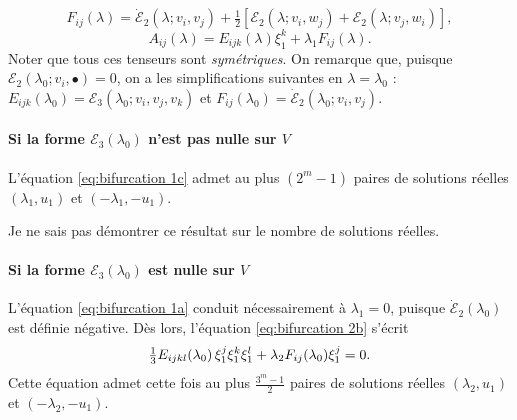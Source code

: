 \documentclass{article}
\newcommand{\nocomma}{}
\newcommand{\tmem}[1]{{\em #1\/}}
\begin{document}
\begin{equation}
  \label{eq:def Fij} F_{i \nocomma j} (\lambda) = \dot{\mathcal{E}}_2 (\lambda
  ; v_i, v_j) + \tfrac{1}{2}  [\mathcal{E}_2 (\lambda  ; v_i, w_j)
  +\mathcal{E}_2 (\lambda  ; v_j, w_i)],
\end{equation}
\begin{equation}
  \label{eq:def Aij} A_{i \nocomma j} (\lambda) = E_{i \nocomma j \nocomma k}
  (\lambda) \xi_1^k + \lambda_1 F_{i \nocomma j} (\lambda) .
\end{equation}
Noter que tous ces tenseurs sont {\tmem{symétriques}}. On remarque que,
puisque $\mathcal{E}_2 (\lambda_0 ; v_i, \bullet) = 0$, on a les
simplifications suivantes en $\lambda = \lambda_0$ : $E_{i \nocomma j \nocomma
k} (\lambda_0) =\mathcal{E}_3 (\lambda_0 ; v_i, v_j, v_k)$ et $F_{i \nocomma
j} (\lambda_0) = \dot{\mathcal{E}}_2 (\lambda_0 ; v_i, v_j)$.

\paragraph{Si la forme $\mathcal{E}_3 (\lambda_0)$ n'est pas nulle sur
$V$}L'équation \eqref{eq:bifurcation 1c} admet au plus $(2^m - 1)$ paires
de solutions réelles $(\lambda_1, u_1)$ et $(- \lambda_1, - u_1)$.

\begin{remark}
  Je ne sais pas démontrer ce résultat sur le nombre de solutions
  réelles.
\end{remark}

\paragraph{Si la forme $\mathcal{E}_3 (\lambda_0)$ est nulle sur
$V$}L'équation \eqref{eq:bifurcation 1a} conduit nécessairement à
$\lambda_1 = 0$, puisque $\dot{\mathcal{E}}_2 (\lambda_0)$ est définie
négative. Dès lors, l'équation \eqref{eq:bifurcation 2b}
s'écrit
\begin{equation}
  \tfrac{1}{3} E_{i \nocomma j \nocomma k \nocomma l} (\lambda_0)
  \hspace{0.17em} \xi_1^j \xi_1^k \xi_1^l + \lambda_2 F_{i \nocomma j}
  (\lambda_0) \xi_1^j = 0.
\end{equation}
Cette équation admet cette fois au plus $\frac{3^m - 1}{2}$ paires de
solutions réelles $(\lambda_2, u_1)$ et $(- \lambda_2, - u_1)$.
\end{document}
